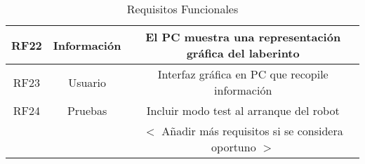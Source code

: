 \begin{center}
\begin{table}[h!]
\begin{adjustbox}{max width=\textwidth}
\begin{tabular}{|c|c|c|}
    \rowcolor{green!20}

    RF22 & Información & El PC muestra una representación gráfica del laberinto  \\ \hline
    \rowcolor{orange!40}


    RF23 & Usuario & Interfaz gráfica en PC que recopile información \\ \hline

    \rowcolor{blue!20}

    RF24 & Pruebas & Incluir modo test al arranque del robot \\ \hline

     & & $<$ Añadir más requisitos si se considera oportuno $>$ \\ \hline
  \end{tabular}
\end{adjustbox}
  \caption{Requisitos Funcionales}
  \label{ReqFuncionales}

\end{table}
\end{center}

\vspace{-20pt}
